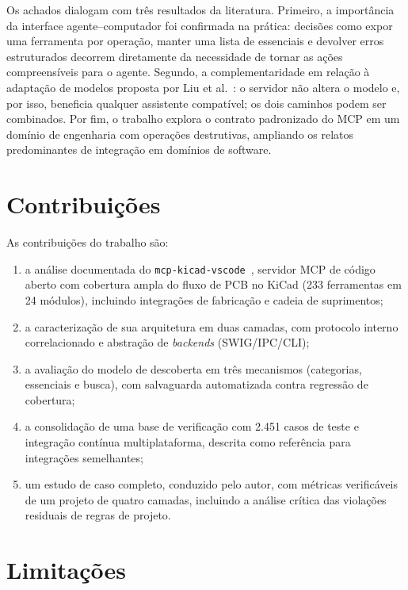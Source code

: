 Os achados dialogam com três resultados da literatura. Primeiro, a
importância da interface agente--computador \citep{yang2024sweagent} foi
confirmada na prática: decisões como expor uma ferramenta por operação, manter
uma lista de essenciais e devolver erros estruturados decorrem diretamente da
necessidade de tornar as ações compreensíveis para o agente. Segundo, a
complementaridade em relação à adaptação de modelos proposta por
Liu et al.~\cite{liu2023chipnemo}: o servidor não altera o modelo e, por isso, beneficia
qualquer assistente compatível; os dois caminhos podem ser combinados. Por
fim, o trabalho explora o contrato padronizado do MCP \citep{mcp2025spec} em
um domínio de engenharia com operações destrutivas, ampliando os relatos
predominantes de integração em domínios de software.

\section{Contribuições}

As contribuições do trabalho são:

\begin{enumerate}[leftmargin=1.4em,itemsep=0.2em]
  \item a análise documentada do \texttt{mcp-kicad-vscode}~\citep{kicadmcpserver},
        servidor MCP de código aberto com cobertura ampla do fluxo de PCB no
        KiCad (233 ferramentas em 24 módulos), incluindo integrações de
        fabricação e cadeia de suprimentos;
  \item a caracterização de sua arquitetura em duas camadas, com protocolo
        interno correlacionado e abstração de \emph{backends} (SWIG/IPC/CLI);
  \item a avaliação do modelo de descoberta em três mecanismos (categorias,
        essenciais e busca), com salvaguarda automatizada contra regressão de
        cobertura;
  \item a consolidação de uma base de verificação com 2.451 casos de teste e
        integração contínua multiplataforma, descrita como referência para
        integrações semelhantes;
  \item um estudo de caso completo, conduzido pelo autor, com métricas
        verificáveis de um projeto de quatro camadas, incluindo a análise
        crítica das violações residuais de regras de projeto.
\end{enumerate}

\section{Limitações}\label{sec:limitacoes}

